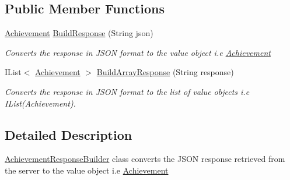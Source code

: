 \subsection*{Public Member Functions}
\begin{DoxyCompactItemize}
\item 
\hyperlink{classcom_1_1shephertz_1_1app42_1_1paas_1_1sdk_1_1windows_1_1achievement_1_1_achievement}{Achievement} \hyperlink{classcom_1_1shephertz_1_1app42_1_1paas_1_1sdk_1_1windows_1_1achievement_1_1_achievement_response_builder_a61686253544734e4503292422fcda14c}{Build\+Response} (String json)
\begin{DoxyCompactList}\small\item\em Converts the response in J\+S\+O\+N format to the value object i.\+e \hyperlink{classcom_1_1shephertz_1_1app42_1_1paas_1_1sdk_1_1windows_1_1achievement_1_1_achievement}{Achievement} \end{DoxyCompactList}\item 
I\+List$<$ \hyperlink{classcom_1_1shephertz_1_1app42_1_1paas_1_1sdk_1_1windows_1_1achievement_1_1_achievement}{Achievement} $>$ \hyperlink{classcom_1_1shephertz_1_1app42_1_1paas_1_1sdk_1_1windows_1_1achievement_1_1_achievement_response_builder_ad4551cff6b95e3976e507e9b03c0a2dc}{Build\+Array\+Response} (String response)
\begin{DoxyCompactList}\small\item\em Converts the response in J\+S\+O\+N format to the list of value objects i.\+e I\+List(\+Achievement). \end{DoxyCompactList}\end{DoxyCompactItemize}


\subsection{Detailed Description}
\hyperlink{classcom_1_1shephertz_1_1app42_1_1paas_1_1sdk_1_1windows_1_1achievement_1_1_achievement_response_builder}{Achievement\+Response\+Builder} class converts the J\+S\+O\+N response retrieved from the server to the value object i.\+e \hyperlink{classcom_1_1shephertz_1_1app42_1_1paas_1_1sdk_1_1windows_1_1achievement_1_1_achievement}{Achievement} 



